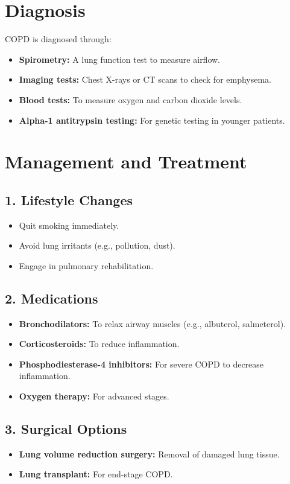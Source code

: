\documentclass{article}
\begin{document}
\section*{Diagnosis}
COPD is diagnosed through:
\begin{itemize}
    \item \textbf{Spirometry:} A lung function test to measure airflow.
    \item \textbf{Imaging tests:} Chest X-rays or CT scans to check for emphysema.
    \item \textbf{Blood tests:} To measure oxygen and carbon dioxide levels.
    \item \textbf{Alpha-1 antitrypsin testing:} For genetic testing in younger patients.
\end{itemize}

\section*{Management and Treatment}
\subsection*{1. Lifestyle Changes}
\begin{itemize}
    \item Quit smoking immediately.
    \item Avoid lung irritants (e.g., pollution, dust).
    \item Engage in pulmonary rehabilitation.
\end{itemize}

\subsection*{2. Medications}
\begin{itemize}
    \item \textbf{Bronchodilators:} To relax airway muscles (e.g., albuterol, salmeterol).
    \item \textbf{Corticosteroids:} To reduce inflammation.
    \item \textbf{Phosphodiesterase-4 inhibitors:} For severe COPD to decrease inflammation.
    \item \textbf{Oxygen therapy:} For advanced stages.
\end{itemize}

\subsection*{3. Surgical Options}
\begin{itemize}
    \item \textbf{Lung volume reduction surgery:} Removal of damaged lung tissue.
    \item \textbf{Lung transplant:} For end-stage COPD.
\end{itemize}
\end{document}

